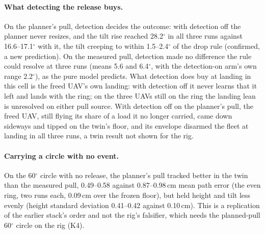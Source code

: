 \paragraph{What detecting the release buys.} On the planner's pull, detection decides the outcome: with detection off
the planner never resizes, and the tilt rise reached 28.2$^\circ$ in all three runs against 16.6--17.1$^\circ$ with it,
the tilt creeping to within 1.5--2.4$^\circ$ of the drop rule (confirmed, a new prediction). On the measured pull,
detection made no difference the rule could resolve at three runs (means 5.6 and 6.4$^\circ$, with the detection-on
arm's own range 2.2$^\circ$), as the pure model predicts. What detection does buy at landing in this cell is the freed
UAV's own landing: with detection off it never learns that it left and lands with the ring; on the three UAVs still on
the ring the landing lean is unresolved on either pull source. With detection off on the planner's pull, the freed UAV,
still flying its share of a load it no longer carried, came down sideways and tipped on the twin's floor, and its
envelope disarmed the fleet at landing in all three runs, a twin result not shown for the rig.

\paragraph{Carrying a circle with no event.} On the 60$^\circ$ circle with no release, the planner's pull tracked
better in the twin than the measured pull, 0.49--0.58 against 0.87--0.98\,cm mean path error (the even ring, two runs
each, 0.09\,cm over the frozen floor), but held height and tilt less evenly (height standard deviation 0.41--0.42
against 0.10\,cm). This is a replication of the earlier stack's order and not the rig's falsifier, which needs the
planned-pull 60$^\circ$ circle on the rig (K4).

